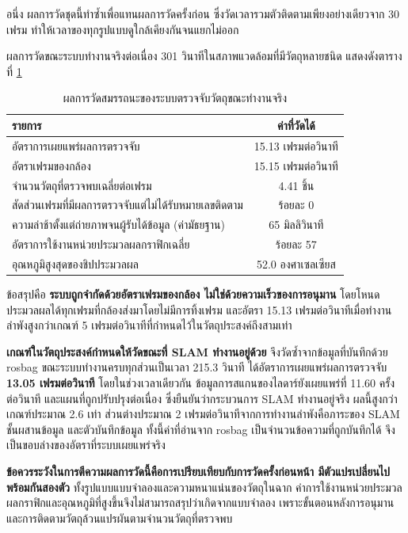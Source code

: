\documentclass[a4paper,12pt]{report}
\begin{document}
อนึ่ง ผลการวัดชุดนี้ทำซ้ำเพื่อแทนผลการวัดครั้งก่อน
ซึ่งวัดเวลารวมตัวติดตามเพียงอย่างเดียวจาก 30 เฟรม
ทำให้เวลาของทุกรูปแบบดูใกล้เคียงกันจนแยกไม่ออก

ผลการวัดขณะระบบทำงานจริงต่อเนื่อง 301 วินาทีในสภาพแวดล้อมที่มีวัตถุหลายชนิด
แสดงดังตารางที่ \ref{tab:modellive}

\begin{table}[htbp]
\centering
\caption[ผลการวัดสมรรถนะของระบบตรวจจับวัตถุขณะทำงานจริง (บทที่ 4)]{ผลการวัดสมรรถนะของระบบตรวจจับวัตถุขณะทำงานจริง}
\label{tab:modellive}
\small
\begin{tabularx}{\textwidth}{|X|c|}
\hline
\textbf{รายการ} & \textbf{ค่าที่วัดได้} \\
\hline
อัตราการเผยแพร่ผลการตรวจจับ & 15.13 เฟรมต่อวินาที \\
\hline
อัตราเฟรมของกล้อง & 15.15 เฟรมต่อวินาที \\
\hline
จำนวนวัตถุที่ตรวจพบเฉลี่ยต่อเฟรม & 4.41 ชิ้น \\
\hline
สัดส่วนเฟรมที่มีผลการตรวจจับแต่ไม่ได้รับหมายเลขติดตาม & ร้อยละ 0 \\
\hline
ความล่าช้าตั้งแต่ถ่ายภาพจนผู้รับได้ข้อมูล (ค่ามัธยฐาน) & 65 มิลลิวินาที \\
\hline
อัตราการใช้งานหน่วยประมวลผลกราฟิกเฉลี่ย & ร้อยละ 57 \\
\hline
อุณหภูมิสูงสุดของชิปประมวลผล & 52.0 องศาเซลเซียส \\
\hline
\end{tabularx}
\end{table}

ข้อสรุปคือ \textbf{ระบบถูกจำกัดด้วยอัตราเฟรมของกล้อง ไม่ใช่ด้วยความเร็วของการอนุมาน}
โดยโหนดประมวลผลได้ทุกเฟรมที่กล้องส่งมาโดยไม่มีการทิ้งเฟรม
และอัตรา 15.13 เฟรมต่อวินาทีเมื่อทำงานลำพังสูงกว่าเกณฑ์ 5 เฟรมต่อวินาทีที่กำหนดไว้ในวัตถุประสงค์ถึงสามเท่า

\textbf{เกณฑ์ในวัตถุประสงค์กำหนดให้วัดขณะที่ SLAM ทำงานอยู่ด้วย}
จึงวัดซ้ำจากข้อมูลที่บันทึกด้วย rosbag ขณะระบบทำงานครบทุกส่วนเป็นเวลา 215.3 วินาที
ได้อัตราการเผยแพร่ผลการตรวจจับ \textbf{13.05 เฟรมต่อวินาที}
โดยในช่วงเวลาเดียวกัน ข้อมูลการสแกนของไลดาร์ยังเผยแพร่ที่ 11.60 ครั้งต่อวินาที
และแผนที่ถูกปรับปรุงต่อเนื่อง ซึ่งยืนยันว่ากระบวนการ SLAM ทำงานอยู่จริง
ผลนี้สูงกว่าเกณฑ์ประมาณ 2.6 เท่า
ส่วนต่างประมาณ 2 เฟรมต่อวินาทีจากการทำงานลำพังคือภาระของ SLAM ชั้นผสานข้อมูล และตัวบันทึกข้อมูล
ทั้งนี้ค่าที่อ่านจาก rosbag เป็นจำนวนข้อความที่ถูกบันทึกได้
จึงเป็นขอบล่างของอัตราที่ระบบเผยแพร่จริง

\textbf{ข้อควรระวังในการตีความผลการวัดนี้คือการเปรียบเทียบกับการวัดครั้งก่อนหน้า
มีตัวแปรเปลี่ยนไปพร้อมกันสองตัว} ทั้งรูปแบบแบบจำลองและความหนาแน่นของวัตถุในฉาก
ค่าการใช้งานหน่วยประมวลผลกราฟิกและอุณหภูมิที่สูงขึ้นจึงไม่สามารถสรุปว่าเกิดจากแบบจำลอง
เพราะขั้นตอนหลังการอนุมานและการติดตามวัตถุล้วนแปรผันตามจำนวนวัตถุที่ตรวจพบ
\end{document}
